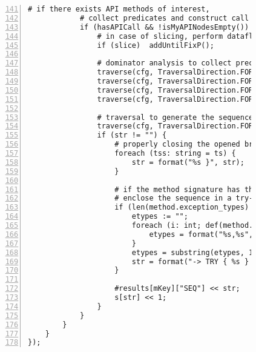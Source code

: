 \begin{figure}[ht!]
\begin{lstlisting}[numbers=left, tabsize=4, escapechar=@, caption={API Usage Mining Analysis},label={lst:aun-code},  firstline = 141, firstnumber = 141, lastline = 201]
            # if there exists API methods of interest, 
            # collect predicates and construct call sequences
		    if (hasAPICall && !isMyAPINodesEmpty()) {
		        # in case of slicing, perform dataflow slicing to capture dependencies
		        if (slice)  addUntilFixP();
		        
		        # dominator analysis to collect preconditions
		        traverse(cfg, TraversalDirection.FORWARD, TraversalKind.SHALLOW_ITERATIVE, allnode_ids);
			    traverse(cfg, TraversalDirection.FORWARD, TraversalKind.HYBRID, cfg_dom, fixp_dom);
			    traverse(cfg, TraversalDirection.FORWARD, TraversalKind.SHALLOW_ITERATIVE, dom_result);
			    traverse(cfg, TraversalDirection.FORWARD, TraversalKind.SHALLOW_ITERATIVE, dom_more);
                
                # traversal to generate the sequence
		        traverse(cfg, TraversalDirection.FORWARD, TraversalKind.SHALLOW_ITERATIVE, seqGen);
    			if (str != "") {
    			    # properly closing the opened braces in the sequence
    				foreach (tss: string = ts) {
    					str = format("%s }", str);
    				}
    				
    				# if the method signature has throws exceptions,
    				# enclose the sequence in a try-catch
    				if (len(method.exception_types) > 0) {
    				    etypes := "";
    				    foreach (i: int; def(method.exception_types[i])) {
    				        etypes = format("%s,%s", etypes, method.exception_types[i].name);
    				    }
    				    etypes = substring(etypes, 1);
    				    str = format("-> TRY { %s } CATCH(%s) {}", str, etypes);
    				}
    				    
    				#results[mKey]["SEQ"] << str; 
    				s[str] << 1; 
    			}
		    }
		}
	}
});
\end{lstlisting}
\end{figure}
